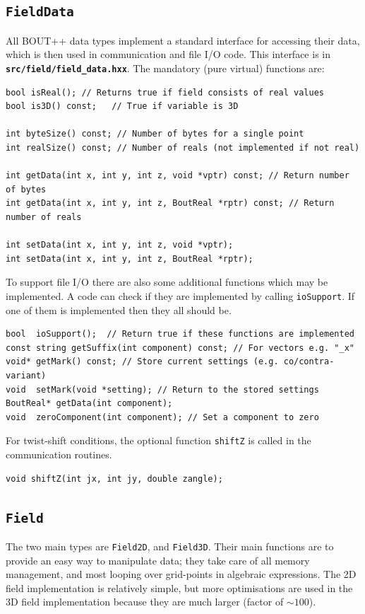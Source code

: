 \documentclass[12pt]{article}
\newcommand{\code}[1]{\texttt{#1}}
\newcommand{\file}[1]{\texttt{\bf #1}}
\begin{document}
\subsection{\code{FieldData}}
All BOUT++ data types implement a standard interface for accessing their
data, which is then used in communication and file I/O code. This interface
is in \file{src/field/field\_data.hxx}. The mandatory (pure virtual) functions are:
\begin{lstlisting}
bool isReal(); // Returns true if field consists of real values
bool is3D() const;   // True if variable is 3D
  
int byteSize() const; // Number of bytes for a single point
int realSize() const; // Number of reals (not implemented if not real)
  
int getData(int x, int y, int z, void *vptr) const; // Return number of bytes
int getData(int x, int y, int z, BoutReal *rptr) const; // Return number of reals
  
int setData(int x, int y, int z, void *vptr);
int setData(int x, int y, int z, BoutReal *rptr);
\end{lstlisting}

To support file I/O there are also some additional functions which may be implemented.
A code can check if they are implemented by calling \code{ioSupport}. If one of them
is implemented then they all should be.
\begin{lstlisting}
bool  ioSupport();  // Return true if these functions are implemented
const string getSuffix(int component) const; // For vectors e.g. "_x"
void* getMark() const; // Store current settings (e.g. co/contra-variant)
void  setMark(void *setting); // Return to the stored settings
BoutReal* getData(int component); 
void  zeroComponent(int component); // Set a component to zero
\end{lstlisting}  

For twist-shift conditions, the optional function \code{shiftZ} is called in the communication
routines.
\begin{lstlisting}
void shiftZ(int jx, int jy, double zangle);
\end{lstlisting}

\subsection{\code{Field}}
The two main types are \code{Field2D}, and \code{Field3D}. Their main functions
are to provide an easy way to manipulate data; they take care of all memory management,
and most looping over grid-points in algebraic expressions. The 2D field implementation
is relatively simple, but more optimisations are used in the 3D field implementation
because they are much larger (factor of $\sim 100$).
\end{document}
